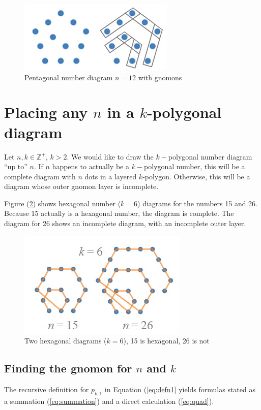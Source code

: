 \documentclass[notitlepage]{report}
\begin{document}
\begin{figure}[!htb]
    \centering
    \includegraphics[width=0.5\linewidth]{pentagon_with_gnomon.PNG}
    \caption{Pentagonal number diagram $n=12$ with gnomons}
    \label{fig:gnomons}
\end{figure}

\section*{Placing any $n$ in a $k$-polygonal diagram}

Let $n,k \in \mathbb{Z}^{+}$, $k > 2$. We would like to draw the $k-$polygonal number diagram ``up to'' $n$. If $n$ happens to actually be a $k-$polygonal number, this will be a complete diagram with $n$ dots in a layered $k$-polygon. Otherwise, this will be a diagram whose outer gnomon layer is incomplete.

Figure (\ref{fig:hexagonals}) shows hexagonal number ($k = 6$) diagrams for the numbers 15 and 26. Because 15 actually is a hexagonal number, the diagram is complete. The diagram for 26 shows an incomplete diagram, with an incomplete outer layer.

\begin{figure}[!htb]
    \centering
    \includegraphics[width=0.5\linewidth]{hexagonal_and_no.PNG}
    \caption{Two hexagonal diagrams ($k = 6$), 15 is hexagonal, 26 is not}
    \label{fig:hexagonals}
\end{figure}


\subsection*{Finding the gnomon for $n$ and $k$}

The recursive definition for $p_{k,1}$ in Equation (\ref{eq:defn1} yields formulas stated as a summation (\ref{eq:summation}) and a direct calculation (\ref{eq:quad}).
\end{document}
